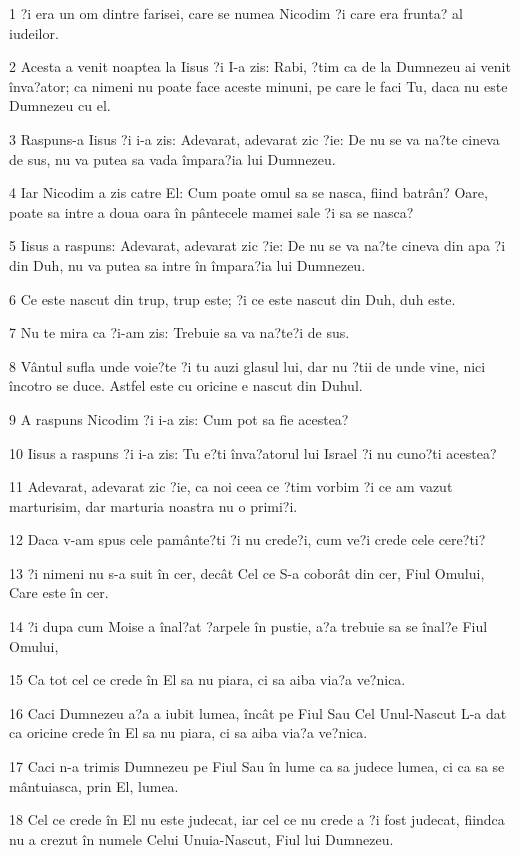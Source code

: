 \par 1 ?i era un om dintre farisei, care se numea Nicodim ?i care era frunta? al iudeilor.
\par 2 Acesta a venit noaptea la Iisus ?i I-a zis: Rabi, ?tim ca de la Dumnezeu ai venit înva?ator; ca nimeni nu poate face aceste minuni, pe care le faci Tu, daca nu este Dumnezeu cu el.
\par 3 Raspuns-a Iisus ?i i-a zis: Adevarat, adevarat zic ?ie: De nu se va na?te cineva de sus, nu va putea sa vada împara?ia lui Dumnezeu.
\par 4 Iar Nicodim a zis catre El: Cum poate omul sa se nasca, fiind batrân? Oare, poate sa intre a doua oara în pântecele mamei sale ?i sa se nasca?
\par 5 Iisus a raspuns: Adevarat, adevarat zic ?ie: De nu se va na?te cineva din apa ?i din Duh, nu va putea sa intre în împara?ia lui Dumnezeu.
\par 6 Ce este nascut din trup, trup este; ?i ce este nascut din Duh, duh este.
\par 7 Nu te mira ca ?i-am zis: Trebuie sa va na?te?i de sus.
\par 8 Vântul sufla unde voie?te ?i tu auzi glasul lui, dar nu ?tii de unde vine, nici încotro se duce. Astfel este cu oricine e nascut din Duhul.
\par 9 A raspuns Nicodim ?i i-a zis: Cum pot sa fie acestea?
\par 10 Iisus a raspuns ?i i-a zis: Tu e?ti înva?atorul lui Israel ?i nu cuno?ti acestea?
\par 11 Adevarat, adevarat zic ?ie, ca noi ceea ce ?tim vorbim ?i ce am vazut marturisim, dar marturia noastra nu o primi?i.
\par 12 Daca v-am spus cele pamânte?ti ?i nu crede?i, cum ve?i crede cele cere?ti?
\par 13 ?i nimeni nu s-a suit în cer, decât Cel ce S-a coborât din cer, Fiul Omului, Care este în cer.
\par 14 ?i dupa cum Moise a înal?at ?arpele în pustie, a?a trebuie sa se înal?e Fiul Omului,
\par 15 Ca tot cel ce crede în El sa nu piara, ci sa aiba via?a ve?nica.
\par 16 Caci Dumnezeu a?a a iubit lumea, încât pe Fiul Sau Cel Unul-Nascut L-a dat ca oricine crede în El sa nu piara, ci sa aiba via?a ve?nica.
\par 17 Caci n-a trimis Dumnezeu pe Fiul Sau în lume ca sa judece lumea, ci ca sa se mântuiasca, prin El, lumea.
\par 18 Cel ce crede în El nu este judecat, iar cel ce nu crede a ?i fost judecat, fiindca nu a crezut în numele Celui Unuia-Nascut, Fiul lui Dumnezeu.
